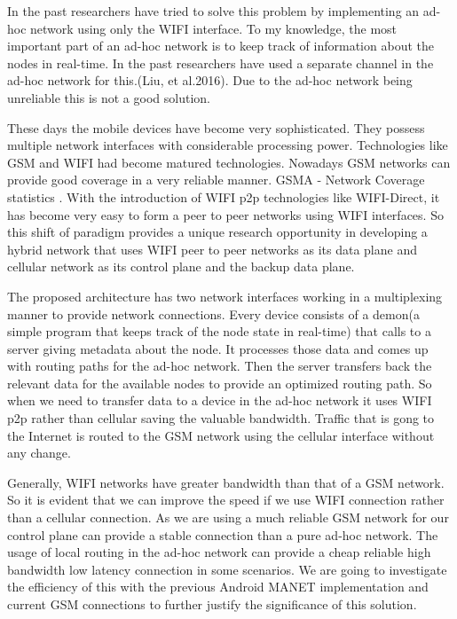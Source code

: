 In the past researchers have tried to solve this problem by implementing an ad-hoc network using only the   WIFI   interface.  To my knowledge, the most important part of an ad-hoc network is to keep track of information about the nodes in real-time. In the past researchers have used a separate channel in the ad-hoc network for this.(Liu, et al.2016)\cite{GO}. Due to the ad-hoc network being unreliable this is not a good solution.

\vspace{12pt}

These days the mobile devices have become very sophisticated. They possess multiple network interfaces with considerable processing power. Technologies like GSM and   WIFI   had become matured technologies. Nowadays GSM networks can provide good coverage in a very reliable manner. GSMA - Network Coverage statistics \cite{GSMANetwork_coverage}. With the introduction of  WIFI  p2p technologies like  WIFI-Direct, it has become very easy to form a peer to peer networks using  WIFI  interfaces. So this shift of paradigm provides a unique research opportunity in developing a hybrid network that uses  WIFI  peer to peer networks as its data plane and cellular network as its control plane and the backup data plane.

\vspace{12pt}

The proposed architecture has two network interfaces working in a multiplexing manner to provide network connections. Every device consists of a demon(a simple program that keeps track of the node state in real-time) that calls to a server giving metadata about the node. It processes those data and comes up with routing paths for the ad-hoc network. Then the server transfers back the relevant data for the available nodes to provide an optimized routing path. So when we need to transfer data to a device in the ad-hoc network it uses  WIFI  p2p rather than cellular saving the valuable bandwidth. Traffic that is gong to the Internet is routed to the GSM network using the cellular interface without any change.

\vspace{12pt}

 Generally,  WIFI  networks have greater bandwidth than that of a GSM network. So it is evident that we can improve the speed if we use  WIFI  connection rather than a cellular connection. As we are using a much reliable GSM network for our control plane can provide a stable connection than a pure ad-hoc network. The usage of local routing in the ad-hoc network can provide a cheap reliable high bandwidth low latency connection in some scenarios. We are going to investigate the efficiency of this with the previous Android  MANET implementation and current GSM connections to further justify the significance of this solution. 

